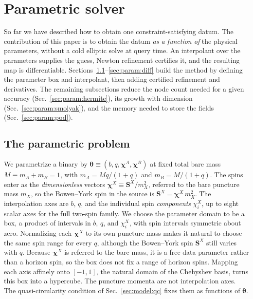 \documentclass[
  aps,
  prd,
  twocolumn,
  10pt,
  amsmath,
  amssymb,
  nofootinbib,
  superscriptaddress,
  floatfix,
]{revtex4-2}
\newcommand{\vect}[1]{\boldsymbol{#1}}
\begin{document}
\section{Parametric solver}
\label{sec:param}
So far we have described how to obtain one constraint-satisfying datum. The
contribution of this paper is to obtain the datum \emph{as a function of} the
physical para\-meters, without a cold elliptic solve at query time.
An interpolant over the parameters supplies the guess, Newton refinement certifies it, and the resulting map is differentiable.
Sections~\ref{sec:param:setup}--\ref{sec:param:diff} build the method by defining the parameter box and interpolant, then adding certified refinement and derivatives.
The remaining subsections reduce the node count needed for a given accuracy (Sec.~\ref{sec:param:hermite}), its growth with dimension (Sec.~\ref{sec:param:smolyak}), and the memory needed to store the fields (Sec.~\ref{sec:param:pod}).

\subsection{The parametric problem}
\label{sec:param:setup}

We parametrize a binary by $\vect{\theta} \equiv (b, q, \boldsymbol{\chi}^{A}, \boldsymbol{\chi}^{B})$ at fixed total bare mass $M \equiv m_A + m_B = 1$, with $m_A = Mq/(1+q)$ and $m_B = M/(1+q)$.
The spins enter as the \emph{dimensionless} vectors $\boldsymbol{\chi}^{X} \equiv \vect{S}^{X}/m_X^2$, referred to the bare puncture mass $m_X$, so the Bowen--York spin in the source is $\vect{S}^{X} = \boldsymbol{\chi}^{X}\, m_X^2$.
The interpolation axes are $b$, $q$, and the individual spin \emph{components} $\chi^{X}_{i}$, up to eight scalar axes for the full two-spin family.
We choose the parameter domain to be a box, a product of intervals in $b$, $q$, and $\chi^{X}_{i}$, with spin intervals symmetric about zero.
Normalizing each $\boldsymbol{\chi}^{X}$ to its own puncture mass makes it natural to choose the same spin range for every $q$, although the Bowen--York spin $\vect{S}^{X}$ still varies with $q$.
Because $\boldsymbol{\chi}^{X}$ is referred to the bare mass, it is a free-data parameter rather than a horizon spin, so the box does not fix a range of horizon spins.
Mapping each axis affinely onto $[-1,1]$, the natural domain of the Chebyshev basis, turns this box into a hypercube.
The puncture momenta are not interpolation axes. The quasi-circularity condition of Sec.~\ref{sec:model:qc} fixes them as functions of $\vect{\theta}$.
\end{document}
